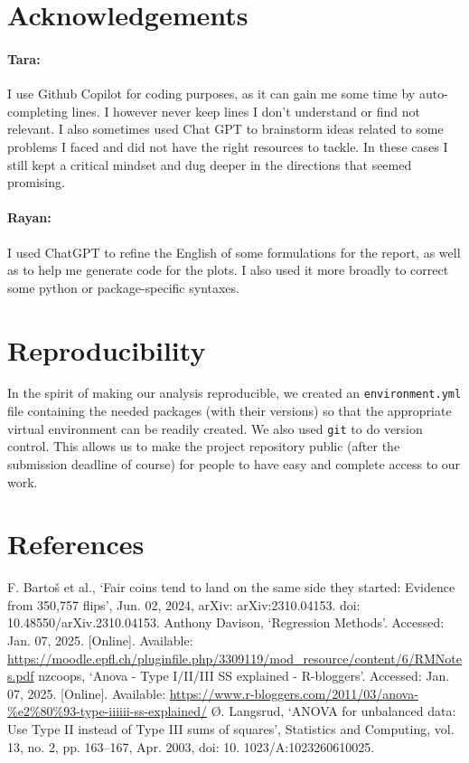 \documentclass[a4paper, 12pt,oneside]{article}
\begin{document}
	\section*{Acknowledgements}
		\paragraph{Tara:}
		I use Github Copilot for coding purposes, as it can gain me some time by auto-completing lines. I however never keep lines I don't understand or find not relevant. I also sometimes used Chat GPT to brainstorm ideas related to some problems I faced and did not have the right resources to tackle. In these cases I still kept a critical mindset and dug deeper in the directions that seemed promising.
		\paragraph{Rayan:}
		I used ChatGPT to refine the English of some formulations for the report, as well as to help me generate code for the plots. I also used it more broadly to correct some python or package-specific syntaxes.
	\section*{Reproducibility}
		In the spirit of making our analysis reproducible, we created an \texttt{environment.yml} file containing the needed packages (with their versions) so that the appropriate virtual environment can be readily created. We also used \texttt{git} to do version control. This allows us to make the project repository public (after the submission deadline of course) for people to have easy and complete access to our work. 
	\section*{References}
		\noindent[1] F. Bartoš et al., `Fair coins tend to land on the same side they started: Evidence from 350,757 flips', Jun. 02, 2024, arXiv: arXiv:2310.04153. doi: 10.48550/arXiv.2310.04153.
		\newline[2] Anthony Davison, `Regression Methods'. Accessed: Jan. 07, 2025. [Online]. Available: \url{https://moodle.epfl.ch/pluginfile.php/3309119/mod_resource/content/6/RMNotes.pdf}
		\newline[3] nzcoops, `Anova - Type I/II/III SS explained - R-bloggers'. Accessed: Jan. 07, 2025. [Online]. Available: \newline\url{https://www.r-bloggers.com/2011/03/anova-\%e2\%80\%93-type-iiiiii-ss-explained/} 
		\newline[4] Ø. Langsrud, `ANOVA for unbalanced data: Use Type II instead of Type III sums of squares', Statistics and Computing, vol. 13, no. 2, pp. 163--167, Apr. 2003, doi: 10. 1023/A:1023260610025.
\end{document}
